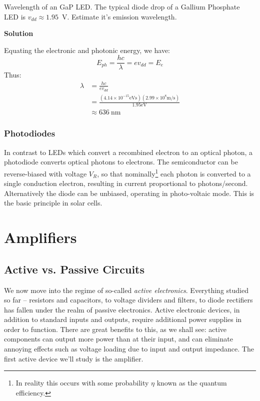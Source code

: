 \documentclass{tufte-book}
\newcommand\Solution{\par\textbf{\textsf{Solution}}\par\medskip}
\begin{document}
\begin{myexample}[label = ex:led_wavelength]{Wavelength of an GaP LED.}
The typical diode drop of a Gallium Phosphate LED is $v_{dd}\approx 1.95$~V. Estimate it's emission wavelength.
\Solution
Equating the electronic and photonic energy, we have:
$$
E_{ph} = \frac{hc}{\lambda}  = ev_{dd} = E_e
$$
Thus:
\begin{align}
\lambda &= \frac{hc}{ev_{dd}} \\
&= \frac{(4.14\times10^{-15}\text{eVs})(2.99\times10^8\text{m/s})}{1.95\text{eV}} \\
&\approx 636~\text{nm}
\end{align}
\end{myexample}
\subsection{Photodiodes}
In contrast to LEDs which convert a recombined electron to an optical photon, a photodiode converts optical photons to electrons. The semiconductor can be reverse-biased with voltage $V_R$, so that nominally\footnote{In reality this occurs with some probability $\eta$ known as the quantum efficiency.} each photon is converted to a single conduction electron, resulting in current proportional to photons/second. Alternatively the diode can be unbiased, operating in photo-voltaic mode. This is the basic principle in solar cells.



\chapter{Amplifiers}
\section{Active vs. Passive Circuits}
We now move into the regime of so-called \textit{active electronics}. Everything studied so far -- resistors and capacitors, to voltage dividers and filters, to diode rectifiers has fallen under the realm of passive electronics. Active electronic devices, in addition to standard inputs and outputs, require additional power supplies in order to function. There are great benefits to this, as we shall see: active components can output more power than at their input, and can eliminate annoying effects such as voltage loading due to input and output impedance. The first active device we'll study is the amplifier.
\end{document}
